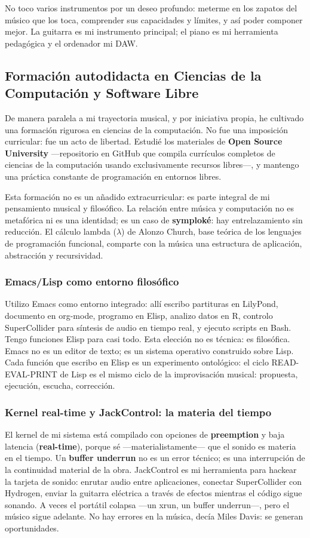 \documentclass[14pt, a4paper]{article}
\begin{document}
No toco varios instrumentos por un deseo profundo: meterme en los
zapatos del músico que los toca, comprender sus capacidades y
límites, y así poder componer mejor. La guitarra es mi instrumento
principal; el piano es mi herramienta pedagógica y el ordenador mi
DAW.
\subsection{Formación autodidacta en Ciencias de la Computación y Software Libre}
\label{formacion-computacion}
De manera paralela a mi trayectoria musical, y por iniciativa propia,
he cultivado una formación rigurosa en ciencias de la computación. No
fue una imposición curricular: fue un acto de libertad. Estudié los
materiales de \textbf{Open Source University} —repositorio en GitHub que
compila currículos completos de ciencias de la computación usando
exclusivamente recursos libres—, y mantengo una práctica constante de
programación en entornos libres.

Esta formación no es un añadido extracurricular: es parte integral de
mi pensamiento musical y filosófico. La relación entre música y
computación no es metafórica ni es una identidad; es un caso de
\textbf{symploké}: hay entrelazamiento sin reducción. El cálculo lambda
(\(\lambda\)) de Alonzo Church, base teórica de los lenguajes de
programación funcional, comparte con la música una estructura de
aplicación, abstracción y recursividad.
\subsubsection{Emacs/Lisp como entorno filosófico}
\label{emacs-lisp}
Utilizo Emacs como entorno integrado: allí escribo partituras en
LilyPond, documento en org-mode, programo en Elisp, analizo datos en
R, controlo SuperCollider para síntesis de audio en tiempo real, y
ejecuto scripts en Bash. Tengo funciones Elisp para casi todo. Esta
elección no es técnica: es filosófica. Emacs no es un editor de texto;
es un sistema operativo construido sobre Lisp. Cada función que escribo
en Elisp es un experimento ontológico: el ciclo READ-EVAL-PRINT de
Lisp es el mismo ciclo de la improvisación musical: propuesta,
ejecución, escucha, corrección.
\subsubsection{Kernel real-time y JackControl: la materia del tiempo}
\label{kernel-jack}
El kernel de mi sistema está compilado con opciones de \textbf{preemption} y
baja latencia (\textbf{real-time}), porque sé —materialistamente— que el
sonido es materia en el tiempo. Un \textbf{buffer underrun} no es un error
técnico; es una interrupción de la continuidad material de la obra.
JackControl es mi herramienta para hackear la tarjeta de sonido:
enrutar audio entre aplicaciones, conectar SuperCollider con Hydrogen,
enviar la guitarra eléctrica a través de efectos mientras el código
sigue sonando. A veces el portátil colapsa —un xrun, un buffer
underrun—, pero el músico sigue adelante. No hay errores en la música,
decía Miles Davis: se generan oportunidades.
\end{document}
